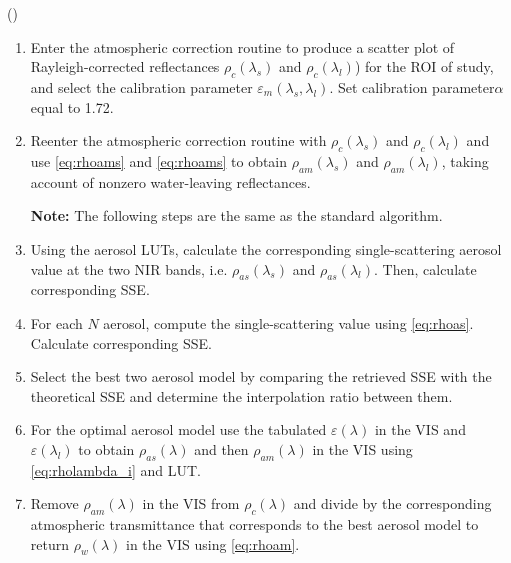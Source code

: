 (\cite{Ruddick:2000bs})
\begin{enumerate}[itemsep=2pt,parsep=2pt]
  \item Enter the atmospheric correction routine to produce a scatter plot of Rayleigh-corrected reflectances $\rho_c(\lambda_s)$ and $\rho_c(\lambda_l)$) for the ROI of study, and select the calibration parameter $\varepsilon_m(\lambda_s,\lambda_l)$. Set calibration parameter$\alpha$ equal to 1.72.
  \item Reenter the atmospheric correction routine with $\rho_c(\lambda_s)$ and $\rho_c(\lambda_l)$ and use \autoref{eq:rhoams} and \autoref{eq:rhoams} to obtain $\rho_{am}(\lambda_s)$ and $\rho_{am}(\lambda_l)$, taking account of nonzero water-leaving reflectances.

  {\bf Note:} The following steps are the same as the standard algorithm.

  \item Using the aerosol LUTs, calculate the corresponding single-scattering aerosol value at the two NIR bands, i.e. $\rho_{as}(\lambda_s)$ and $\rho_{as}(\lambda_l)$. Then, calculate corresponding SSE.
  \item For each $N$ aerosol, compute the single-scattering value using \autoref{eq:rhoas}. Calculate corresponding SSE.
  \item Select the best two aerosol model by comparing the retrieved SSE with the theoretical SSE and determine the interpolation ratio between them.
  \item For the optimal aerosol model use the tabulated $\varepsilon(\lambda)$ in the VIS and $\varepsilon(\lambda_l)$ to obtain $\rho_{as}(\lambda)$ and then $\rho_{am}(\lambda)$ in the VIS using \autoref{eq:rholambda_i} and LUT.
  \item Remove $\rho_{am}(\lambda)$ in the VIS from $\rho_c(\lambda)$ and divide by the corresponding atmospheric transmittance that corresponds to the best aerosol model to return $\rho_w(\lambda)$ in the VIS using \autoref{eq:rhoam}.
\end{enumerate}

